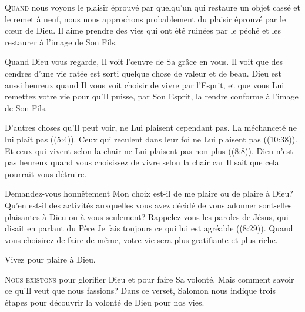 \lettrine{Q}{uand} nous voyons le plaisir éprouvé par quelqu'un
 qui restaure un objet cassé et le remet à neuf,
 nous nous approchons probablement du plaisir éprouvé par le c\oe{}ur de Dieu.
 Il aime prendre des vies qui ont été ruinées par le péché
 et les restaurer à l'image de Son Fils. 

Quand Dieu vous regarde, Il voit l'\oe{}uvre de Sa grâce en vous.
 Il voit que des cendres d'une vie ratée est sorti quelque chose
 de valeur et de beau.
 Dieu est aussi heureux quand Il vous voit choisir de vivre par l'Esprit,
 et que vous Lui remettez votre vie pour qu'Il puisse, par Son Esprit,
 la rendre conforme à l'image de Son Fils. 


D'autres choses qu'Il peut voir, ne Lui plaisent cependant pas.
 La méchanceté ne lui plaît pas ((5:4)).
 Ceux qui reculent dans leur foi ne Lui plaisent pas ((10:38)).
 Et ceux qui vivent selon la chair ne Lui plaisent pas non plus
 ((8:8)).
 Dieu n'est pas heureux quand vous choisissez de vivre selon la chair
 car Il sait que cela pourrait vous détruire. 

Demandez-vous honnêtement\frcolon{}
 Mon choix est-il de me plaire ou de plaire à Dieu?
 Qu'en est-il des activités auxquelles vous avez décidé de vous adonner
 \ocadr sont-elles plaisantes à Dieu ou à vous seulement?
 Rappelez-vous les paroles de Jésus, qui disait en parlant du Père\frcolon{}
 \Og Je fais toujours ce qui lui est agréable \Fg{} ((8:29)).
 Quand vous choisirez de faire de même,
 votre vie sera plus gratifiante et plus riche. 

Vivez pour plaire à Dieu. 

\dvrule






\lettrine{N}{ous existons} pour glorifier Dieu et pour faire Sa volonté.
 Mais comment savoir ce qu'Il veut que nous fassions?
 Dans ce verset, Salomon nous indique trois étapes pour découvrir
 la volonté de Dieu pour nos vies. 

